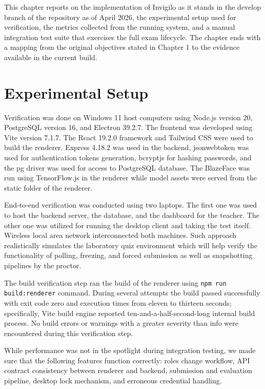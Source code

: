 \documentclass[12pt, a4paper]{report}
\begin{document}
\begin{justify}
  {\fontsize{12}{18}\selectfont
    This chapter reports on the implementation of Invigilo as it stands in the develop branch of the repository as of April 2026, the experimental setup used for verification, the metrics collected from the running system, and a manual integration test suite that exercises the full exam lifecycle. The chapter ends with a mapping from the original objectives stated in Chapter 1 to the evidence available in the current build.
  }
\end{justify}

\section{Experimental Setup}

\begin{justify}
  {\fontsize{12}{18}\selectfont
    Verification was done on Windows 11 host computers using Node.js version 20, PostgreSQL version 16, and Electron 39.2.7. The frontend was developed using Vite version 7.1.7. The React 19.2.0 framework and Tailwind CSS were used to build the renderer. Express 4.18.2 was used in the backend, jsonwebtoken was used for authentication tokens generation, bcryptjs for hashing passwords, and the pg driver was used for access to PostgreSQL database. The BlazeFace was run using TensorFlow.js in the renderer while model assets were served from the static folder of the renderer.

    End-to-end verification was conducted using two laptops. The first one was used to host the backend server, the database, and the dashboard for the teacher. The other one was utilized for running the desktop client and taking the test itself. Wireless local area network interconnected both machines. Such approach realistically simulates the laboratory quiz environment which will help verify the functionality of polling, freezing, and forced submission as well as snapshotting pipelines by the proctor.

   The build verification step ran the build of the renderer using \texttt{npm run build:renderer} command. During several attempts the build passed successfully with exit code zero and execution times from eleven to thirteen seconds; specifically, Vite build engine reported ten-and-a-half-second-long internal build process. No build errors or warnings with a greater severity than info were encountered during this verification step.

   While performance was not in the spotlight during integration testing, we made sure that the following features function correctly: roles change workflow, API contract consistency between renderer and backend, submission and evaluation pipeline, desktop lock mechanism, and erroneous credential handling.
  }
\end{justify}
\end{document}
